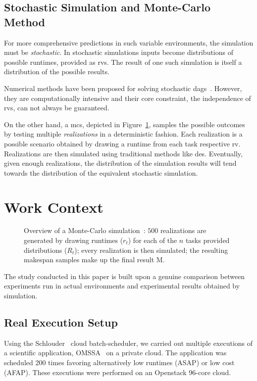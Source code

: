 \documentclass[10pt,conference,compsocconf]{IEEEtran}
\begin{document}
\subsection{Stochastic Simulation and Monte-Carlo Method}

\label{sc:relwork-stochastic}
For  more   comprehensive  predictions  in  such   variable  environments,  the
simulation must  be \emph{stochastic}.  In stochastic simulations  inputs become
distributions of possible runtimes, provided as \acp{rv}.
The  result  of one  such  simulation  is  itself  a distribution of the
possible results.

Numerical methods have been proposed for solving stochastic
\acp{dag}~\cite{Li97,Ludwig01}. However, they are computationally intensive and
their core constraint, the independence of \acp{rv}, can not always be
guaranteed. 

On the other hand, a \ac{mcs}, depicted in Figure~\ref{fig:mc-process}, samples
the possible outcomes by testing  multiple \emph{realizations} in a
deterministic fashion.  Each realization is a possible scenario obtained by
drawing a runtime from each task respective \ac{rv}.  Realizations are then
simulated using traditional methods like \ac{des}.  Eventually, given enough
realizations, the distribution of the simulation results will  tend towards the
distribution of the equivalent stochastic simulation. 

\section{Work Context}
\label{sec:work-context}
\begin{figure}
	\centering
	\resizebox{0.9\linewidth}{!}{%
		
		}
\caption{Overview of a Monte-Carlo simulation~: $500$ realizations are generated
	by drawing runtimes ($r_t$) for each of the $n$ tasks provided
	distributions ($R_t$); every realization is then simulated; the 
	resulting makespan samples make up the final result M.}\label{fig:mc-process}
\end{figure}

The  study conducted  in this  paper  is built upon a genuine comparison  between
experiments  run in  actual environments  and experimental  results obtained  by
simulation.  

\subsection{Real Execution Setup}
Using the Schlouder~\cite{Michon17} cloud batch-scheduler, we carried out
multiple executions of a scientific application, OMSSA~\cite{Geer2004} on a
private cloud.
The application was scheduled 200 times favoring alternatively low runtimes (ASAP) or 
low cost (AFAP). These executions were performed on an Openstack 96-core cloud. 
\end{document}
